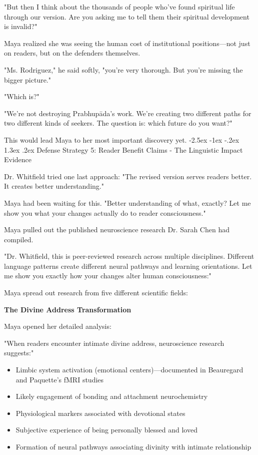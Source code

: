 \documentclass[12pt,twoside]{book}
\makeatletter
\renewcommand\section{\@startsection{section}{1}{\z@}%
{-2.5ex \@plus -1ex \@minus -.2ex}%
{1.3ex \@plus.2ex}%
{\normalfont\Large\bfseries}}
\makeatother
\begin{document}
"But then I think about the thousands of people who've found spiritual life through our version. Are you asking me to tell them their spiritual development is invalid?"

Maya realized she was seeing the human cost of institutional positions—not just on readers, but on the defenders themselves.

"Ms. Rodriguez," he said softly, "you're very thorough. But you're missing the bigger picture."

"Which is?"

"We're not destroying Prabhupāda's work. We're creating two different paths for two different kinds of seekers. The question is: which future do you want?"

This would lead Maya to her most important discovery yet.
\section{Defense Strategy 5: Reader Benefit Claims - The Linguistic Impact Evidence}
\label{sec:orgbbbc9d2}

Dr. Whitfield tried one last approach: "The revised version serves readers better. It creates better understanding."

Maya had been waiting for this. "Better understanding of what, exactly? Let me show you what your changes actually do to reader consciousness."

Maya pulled out the published neuroscience research Dr. Sarah Chen had compiled.

"Dr. Whitfield, this is peer-reviewed research across multiple disciplines. Different language patterns create different neural pathways and learning orientations. Let me show you exactly how your changes alter human consciousness:"

Maya spread out research from five different scientific fields:

\textbf{\textbf{The Divine Address Transformation}}

Maya opened her detailed analysis:

"When readers encounter intimate divine address, neuroscience research suggests:"
\begin{itemize}
\item Limbic system activation (emotional centers)—documented in Beauregard and Paquette's fMRI studies
\item Likely engagement of bonding and attachment neurochemistry
\item Physiological markers associated with devotional states
\item Subjective experience of being personally blessed and loved
\item Formation of neural pathways associating divinity with intimate relationship
\end{itemize}
\end{document}
